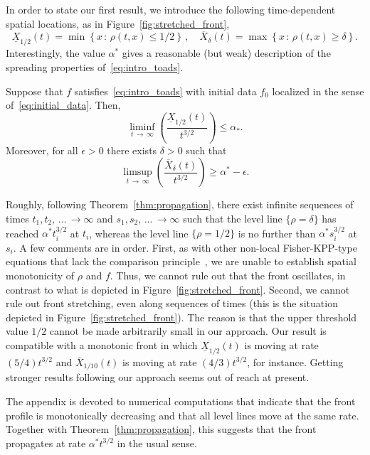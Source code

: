 \documentclass[AHL,Unicode,longabstracts]{cedram}
\newcommand{\1}{\mathds{1}}
\newcommand{\e}{\epsilon}
\begin{document}
In order to state our first result, we introduce the following time-dependent spatial locations, as in Figure~\ref{fig:stretched_front},
\[
\underline{X}_{1/2}(t) = \min\left\{x\,:\,\rho(t,x) \leq 1/2\right\} \,, \quad \overline{X}_{\delta}(t) = \max\left\{x\,:\,\rho(t,x) \geq \delta\right\}.
\]
Interestingly, the value $\alpha^*$ gives a reasonable (but weak) description of the spreading properties of~\eqref{eq:intro_toads}.

\begin{theo}\label{thm:propagation}
Suppose that $f$ satisfies~\eqref{eq:intro_toads} with initial data $f_0$ localized in the sense of~\eqref{eq:initial_data}. Then,
\[
\liminf_{t\,\to\,\infty} \left(\frac{\underline{X}_{1/2}(t)}{t^{3/2}}\right) \leq \alpha_*.
\]
Moreover, for all $\e>0$ there exists $\delta>0$ such that
\begin{equation}\label{eq:lower_bound}
\limsup_{t\,\to\,\infty} \left(\frac{\overline{X}_{\delta}(t)}{t^{3/2}}\right) \geq \alpha^* - \e.
\end{equation}
\end{theo}

Roughly, following Theorem~\ref{thm:propagation}, there exist infinite sequences of times $t_1, t_2, \,\dots\,\to \infty$ and $s_1,s_2,\,\dots\,\to\infty$ such that the level line $\{\rho = \delta\}$ has reached $\alpha^* t_i^{3/2}$ at $t_i$, whereas the level line $\{\rho = 1/2\}$ is no further than $\alpha^* s_i^{3/2}$ at $s_i$. A few comments are in order. First, as with other non-local Fisher-KPP-type equations that lack the comparison principle~\cite{berestycki_non-local_2009}, we are unable to establish spatial monotonicity of $\rho$ and $f$. Thus, we cannot rule out that the front oscillates, in contrast to what is depicted in Figure~\ref{fig:stretched_front}. Second, we cannot rule out front stretching, even along sequences of times (this is the situation depicted in Figure~\ref{fig:stretched_front}). The reason is that the upper threshold value $1/2$ cannot be made arbitrarily small in our approach. Our result is compatible with a monotonic front in which $\underline{X}_{1/2}(t)$ is moving at rate $(5/4)t^{3/2}$ and $\overline{X}_{1/10}(t)$ is moving at rate $(4/3)t^{3/2}$, for instance. Getting stronger results following our approach seems out of reach at present.

The appendix is devoted to numerical computations that indicate that the front profile is monotonically decreasing and that all level lines move at the same rate. Together with Theorem~\ref{thm:propagation}, this suggests that the front propagates at rate $\alpha^* t^{3/2}$ in the usual sense.
\end{document}
